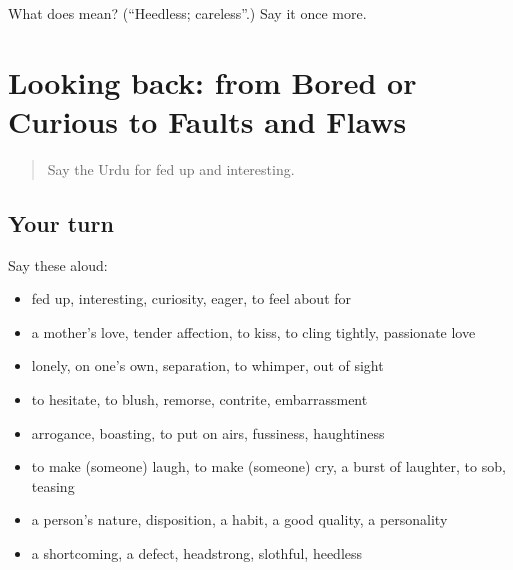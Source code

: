 \begin{tcolorbox}[breakable,colback=teal!4,colframe=teal!35!black,title={Before you move on}]
What does  mean? (\textquotedblleft{}Heedless; careless\textquotedblright{}.) Say it once more.
\end{tcolorbox}
\section[(dialogue)]{Looking back: from Bored or Curious to Faults and Flaws}

\label{lesson:UR-R455-review-448-455}



\begin{quote}
Say the Urdu for fed up and interesting.
\end{quote}

\subsection*{Your turn}
Say these aloud:

\begin{itemize}
\raggedright
  \item fed up, interesting, curiosity, eager, to feel about for
  \item a mother's love, tender affection, to kiss, to cling tightly, passionate love
  \item lonely, on one's own, separation, to whimper, out of sight
  \item to hesitate, to blush, remorse, contrite, embarrassment
  \item arrogance, boasting, to put on airs, fussiness, haughtiness
  \item to make (someone) laugh, to make (someone) cry, a burst of laughter, to sob, teasing
  \item a person's nature, disposition, a habit, a good quality, a personality
  \item a shortcoming, a defect, headstrong, slothful, heedless
\end{itemize}

